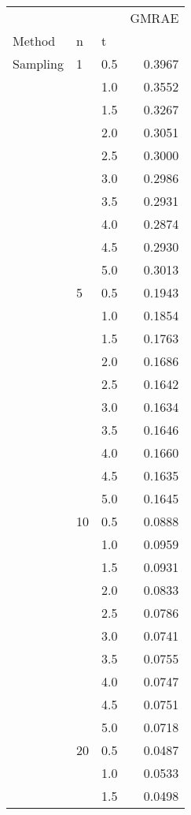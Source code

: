 \begin{tabular}{lllr}
\toprule
          &     &     &  GMRAE \\
Method & n & t &        \\
\midrule
Sampling & 1   & 0.5 & 0.3967 \\
          &     & 1.0 & 0.3552 \\
          &     & 1.5 & 0.3267 \\
          &     & 2.0 & 0.3051 \\
          &     & 2.5 & 0.3000 \\
          &     & 3.0 & 0.2986 \\
          &     & 3.5 & 0.2931 \\
          &     & 4.0 & 0.2874 \\
          &     & 4.5 & 0.2930 \\
          &     & 5.0 & 0.3013 \\
          & 5   & 0.5 & 0.1943 \\
          &     & 1.0 & 0.1854 \\
          &     & 1.5 & 0.1763 \\
          &     & 2.0 & 0.1686 \\
          &     & 2.5 & 0.1642 \\
          &     & 3.0 & 0.1634 \\
          &     & 3.5 & 0.1646 \\
          &     & 4.0 & 0.1660 \\
          &     & 4.5 & 0.1635 \\
          &     & 5.0 & 0.1645 \\
          & 10  & 0.5 & 0.0888 \\
          &     & 1.0 & 0.0959 \\
          &     & 1.5 & 0.0931 \\
          &     & 2.0 & 0.0833 \\
          &     & 2.5 & 0.0786 \\
          &     & 3.0 & 0.0741 \\
          &     & 3.5 & 0.0755 \\
          &     & 4.0 & 0.0747 \\
          &     & 4.5 & 0.0751 \\
          &     & 5.0 & 0.0718 \\
          & 20  & 0.5 & 0.0487 \\
          &     & 1.0 & 0.0533 \\
          &     & 1.5 & 0.0498 \\

\end{tabular}
